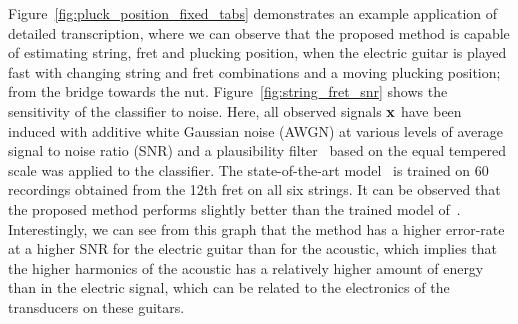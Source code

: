 Figure~\ref{fig:pluck_position_fixed_tabs} demonstrates an example application of detailed transcription, where we can observe that the proposed method is capable of estimating string, fret and plucking position, when the electric guitar is played fast with changing string and fret combinations and a moving plucking position; from the bridge towards the nut. Figure~\ref{fig:string_fret_snr} shows the sensitivity of the classifier to noise. Here, all observed signals $\mathbf x$ have been induced with additive white Gaussian noise (AWGN) at various levels of average signal to noise ratio (SNR) and a plausibility filter~\cite{abesser:automatic_string_detection_ml,hjerrild::icassp19} based on the equal tempered scale was applied to the classifier. The state-of-the-art model~\cite{hjerrild::icassp19} is trained on 60 recordings obtained from the 12th fret on all six strings. It can be observed that the proposed method performs slightly better than the trained model of~\cite{hjerrild::icassp19}. Interestingly, we can see from this graph that the method has a higher error-rate at a higher SNR for the electric guitar than for the acoustic, which implies that the higher harmonics of the acoustic has a relatively higher amount of energy than in the electric signal, which can be related to the electronics of the transducers on these guitars. 

